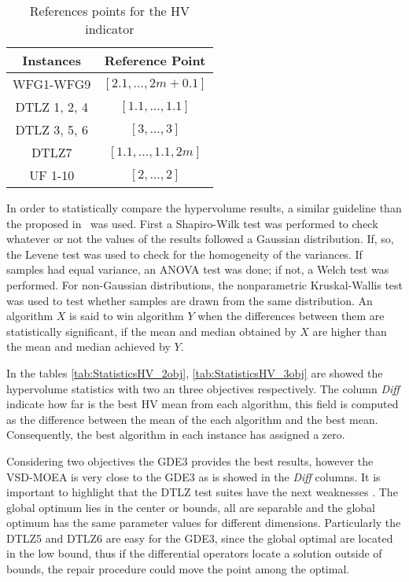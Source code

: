 \begin{table}[t]
\centering
\caption{References points for the HV indicator}
\label{tab:ReferencePoints}
\begin{tabular}{cc}
\hline
\textbf{Instances} & \textbf{Reference Point} \\ \hline
WFG1-WFG9 & $[2.1, ...,2m+0.1]$ \\
DTLZ 1, 2, 4 & $[1.1, ..., 1.1]$ \\
DTLZ 3, 5, 6 & $[3, ..., 3]$ \\
DTLZ7 & $[1.1, ..., 1.1, 2m]$ \\
UF 1-10 & $[2, ..., 2]$ \\ \hline
\end{tabular}
\end{table}
%
In order to statistically compare the hypervolume results, a similar guideline than the proposed in~\cite{Joel:StatisticalTest} was used. 
%
First a Shapiro-Wilk test was performed to check whatever or not the values of the results followed a Gaussian distribution. 
%
If, so, the Levene test was used to check for the homogeneity of the variances. 
%
If samples had equal variance, an ANOVA test was done; if not, a Welch test was performed. 
%
For non-Gaussian distributions, the nonparametric Kruskal-Wallis test was used to test whether samples are drawn from the same distribution. 
%
An algorithm $X$ is said to win algorithm $Y$ when the differences between them are statistically significant, if the mean and median obtained by $X$ are higher than the mean and median achieved by $Y$.

%

In the tables \ref{tab:StatisticsHV_2obj}, \ref{tab:StatisticsHV_3obj} are showed the hypervolume statistics with two an three objectives respectively.
%
The column \textit{Diff} indicate how far is the best HV mean from each algorithm, this field is computed as the difference between the mean of the each algorithm and the best mean.
%
Consequently, the best algorithm in each instance has assigned a zero.
%

Considering two objectives the GDE3 provides the best results, however the VSD-MOEA is very close to the GDE3 as is showed in the \textit{Diff} columns.
%
It is important to highlight that the DTLZ test suites have the next weaknesses \cite{Joel:CEC2009}.
The global optimum lies in the center or bounds, all are separable and the global optimum has the same parameter values for different dimensions.
%
Particularly the DTLZ5 and DTLZ6 are easy for the GDE3, since the global optimal are located in the low bound, thus if the differential operators locate a solution outside of bounds, the repair procedure could move the point among the optimal.


